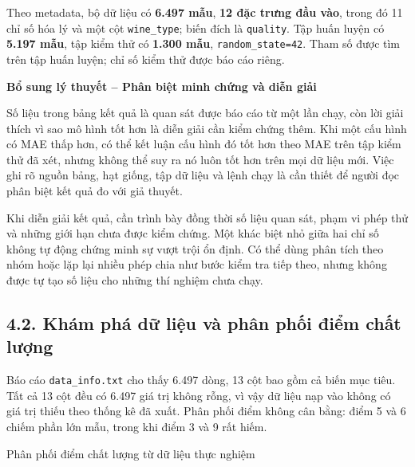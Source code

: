 \documentclass[12pt,a4paper,oneside]{article}
\begin{document}
Theo metadata, bộ dữ liệu có \textbf{6.497 mẫu}, \textbf{12 đặc trưng
đầu vào}, trong đó 11 chỉ số hóa lý và một cột \texttt{wine\_type}; biến
đích là \texttt{quality}. Tập huấn luyện có \textbf{5.197 mẫu}, tập kiểm
thử có \textbf{1.300 mẫu}, \texttt{random\_state=42}. Tham số được tìm
trên tập huấn luyện; chỉ số kiểm thử được báo cáo riêng.


\par\noindent\textbf{Bổ sung lý thuyết -- Phân biệt minh chứng và diễn giải}\par
Số liệu trong bảng kết quả là quan sát được báo cáo từ một lần chạy, còn lời giải thích vì sao mô hình tốt hơn là diễn giải cần kiểm chứng thêm. Khi một cấu hình có MAE thấp hơn, có thể kết luận cấu hình đó tốt hơn theo MAE trên tập kiểm thử đã xét, nhưng không thể suy ra nó luôn tốt hơn trên mọi dữ liệu mới. Việc ghi rõ nguồn bảng, hạt giống, tập dữ liệu và lệnh chạy là cần thiết để người đọc phân biệt kết quả đo với giả thuyết.\par

Khi diễn giải kết quả, cần trình bày đồng thời số liệu quan sát, phạm vi phép thử và những giới hạn chưa được kiểm chứng. Một khác biệt nhỏ giữa hai chỉ số không tự động chứng minh sự vượt trội ổn định. Có thể dùng phân tích theo nhóm hoặc lặp lại nhiều phép chia như bước kiểm tra tiếp theo, nhưng không được tự tạo số liệu cho những thí nghiệm chưa chạy.\par

\subsection*{4.2. Khám phá dữ liệu và phân phối điểm chất lượng}

Báo cáo \texttt{data\_info.txt} cho thấy 6.497 dòng, 13 cột bao gồm cả
biến mục tiêu. Tất cả 13 cột đều có 6.497 giá trị không rỗng, vì vậy dữ
liệu nạp vào không có giá trị thiếu theo thống kê đã xuất. Phân phối
điểm không cân bằng: điểm 5 và 6 chiếm phần lớn mẫu, trong khi điểm 3 và
9 rất hiếm.

Phân phối điểm chất lượng từ dữ liệu thực nghiệm
\end{document}
